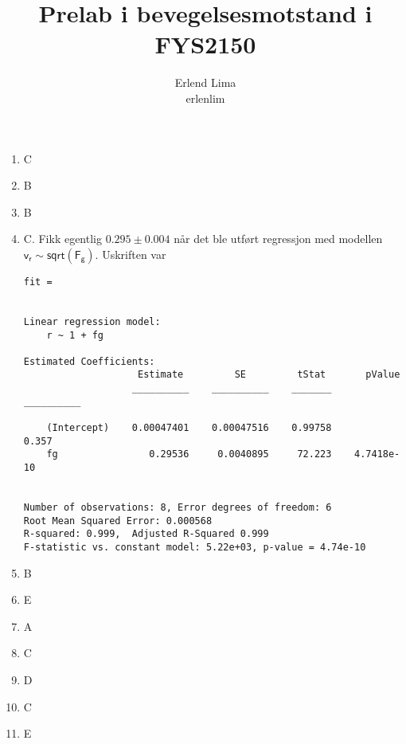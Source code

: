 \documentclass[a4paper,11pt, norsk, twoside]{article}
\title{Prelab i bevegelsesmotstand i FYS2150} \author{Erlend Lima\\ erlenlim}
\begin{document}
\maketitle
{}
\begin{enumerate}[1.]
\item C
\item B
\item B
\item C. Fikk egentlig \(0.295\pm 0.004\) når det ble utført regressjon
  med modellen \(\mathsf{v_{r} \sim sqrt(F_{g})}\). Uskriften var
  \begin{lstlisting}
fit = 


Linear regression model:
    r ~ 1 + fg

Estimated Coefficients:
                    Estimate         SE         tStat       pValue  
                   __________    __________    _______    __________

    (Intercept)    0.00047401    0.00047516    0.99758         0.357
    fg                0.29536     0.0040895     72.223    4.7418e-10


Number of observations: 8, Error degrees of freedom: 6
Root Mean Squared Error: 0.000568
R-squared: 0.999,  Adjusted R-Squared 0.999
F-statistic vs. constant model: 5.22e+03, p-value = 4.74e-10    
  \end{lstlisting}
\item B
\item E
\item A
\item C
\item D
\item C
\item E
\end{enumerate}
\end{document}
